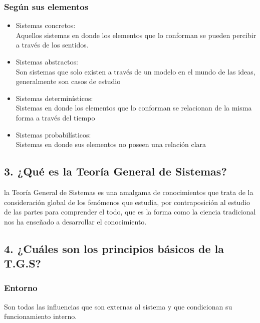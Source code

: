 \documentclass[a4paper,man,natbib]{apa6}
\begin{document}
\subsubsection{Según sus elementos}
\begin{itemize}
    \item Sistemas concretos:\\ 
    Aquellos sistemas en donde los elementos que lo conforman se pueden percibir a través de los sentidos.

    \item Sistemas abstractos:\\
    Son sistemas que solo existen a través de un modelo en el mundo de las ideas, generalmente son casos de estudio \citep{10.2307/j.ctv1228hsw}

    \item Sistemas determinísticos:\\ 
    Sistemas en donde los elementos que lo conforman se relacionan de la misma forma a través del tiempo \citep{10.2307/j.ctv1228hsw}

    \item Sistemas probabilísticos:\\ 
    Sistemas en donde sus elementos no poseen una relación clara \citep{10.2307/j.ctv1228hsw}

    
\end{itemize}

\subsection{3. ¿Qué es la Teoría General de Sistemas?}
la Teoría General
de Sistemas es una amalgama de conocimientos que trata de la consideración
global de los fenómenos que estudia, por contraposición al estudio de las partes
para comprender el todo, que es la forma como la ciencia tradicional nos ha
enseñado a desarrollar el conocimiento. \citep{von1976teoria}

\subsection{4. ¿Cuáles son los principios básicos de la T.G.S?}
\subsubsection{Entorno}
Son todas las influencias que son externas al sistema y que condicionan su funcionamiento interno. \citep{10.2307/j.ctv1228hsw}
\end{document}

